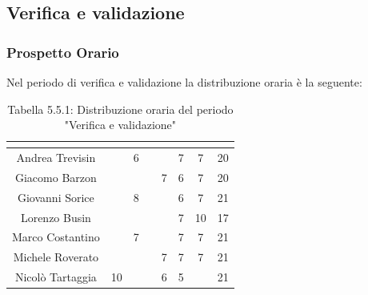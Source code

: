 \subsection{Verifica e validazione}

\subsubsection{Prospetto Orario}
Nel periodo di verifica e validazione la distribuzione oraria è la seguente:

\renewcommand{\arraystretch}{1.5}
\begin{table}[H]
\begin{center}
\begin{tabular}{|c|c|c|c|c|c|c|c|}
\hline
\rowcolor{title_row}
\textbf{\color{title_text}{Nome}} & \textbf{\color{title_text}{Resp.}} & \textbf{\color{title_text}{Ammi.}} & \textbf{\color{title_text}{Analist.}} & \textbf{\color{title_text}{Progett.}} & \textbf{\color{title_text}{Program.}} & \textbf{\color{title_text}{Verific.}} & \textbf{\color{title_text}{Totale}} \\ \hline
Andrea Trevisin  & & 6 & & & 7 & 7 & 20  \\ \hline
Giacomo Barzon   & & & & 7 & 6 & 7 & 20  \\ \hline
Giovanni Sorice  & & 8 & &  & 6 & 7 & 21  \\ \hline
Lorenzo Busin    & & & & & 7 & 10 & 17  \\ \hline
Marco Costantino & & 7 & & & 7 & 7 & 21  \\ \hline
Michele Roverato & & & & 7 & 7 & 7 & 21  \\ \hline
Nicolò Tartaggia & 10 & & & 6 & 5 & & 21  \\ \hline
\end{tabular}
\caption{Tabella 5.5.1: Distribuzione oraria del periodo "Verifica e validazione"\label{}}
\end{center}
\end{table}
\renewcommand{\arraystretch}{1}

